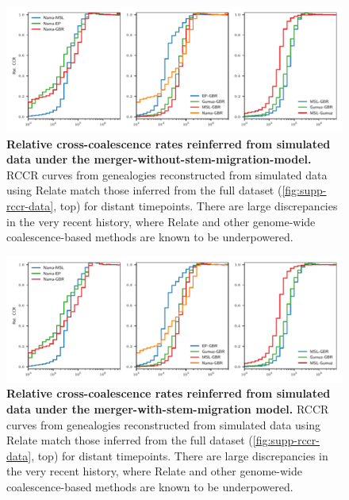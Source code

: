 \documentclass[]{article}
\begin{document}
\begin{figure}[ht]
    \centering
    \includegraphics[width=\textwidth]{figures/supp-relate-rccr-merger-without-stem-migration}
    \caption{
        \textbf{Relative cross-coalescence rates reinferred from simulated data
        under the merger-without-stem-migration-model.} RCCR curves from genealogies
        reconstructed from simulated data using Relate match those inferred
        from the full dataset (\ref{fig:supp-rccr-data}, top) for distant
        timepoints. There are large discrepancies in the very recent history,
        where Relate and other genome-wide coalescence-based methods are known
        to be underpowered.
    }
    \label{fig:supp-rccr-merger-without-stem-migration}
\end{figure}

\begin{figure}[ht]
    \centering
    \includegraphics[width=\textwidth]{figures/supp-relate-rccr-merger-with-stem-migration}
    \caption{
        \textbf{Relative cross-coalescence rates reinferred from simulated data
        under the merger-with-stem-migration model.} RCCR curves from genealogies
        reconstructed from simulated data using Relate match those inferred
        from the full dataset (\ref{fig:supp-rccr-data}, top) for distant
        timepoints. There are large discrepancies in the very recent history,
        where Relate and other genome-wide coalescence-based methods are known
        to be underpowered.
    }
    \label{fig:supp-rccr-merger-with-stem-migration}
\end{figure}
\end{document}
